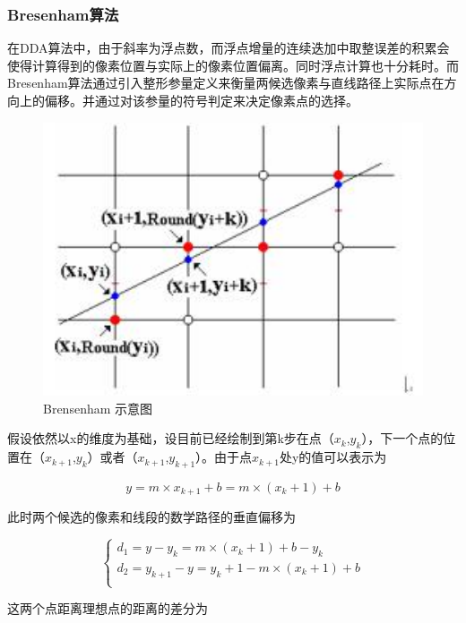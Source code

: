 \documentclass[a4paper,UTF8]{article}
\theoremstyle{definition}
\begin{document}
\subsubsection{Bresenham算法}
在DDA算法中，由于斜率为浮点数，而浮点增量的连续迭加中取整误差的积累会使得计算得到的像素位置与实际上的像素位置偏离。同时浮点计算也十分耗时。而Bresenham算法通过引入整形参量定义来衡量两候选像素与直线路径上实际点在方向上的偏移。并通过对该参量的符号判定来决定像素点的选择。
\begin{figure}[ht]
\centering
\includegraphics[width=13cm]{x1.jpg}
\caption{Brensenham 示意图}
\label{x1}
\end{figure}
\par 假设依然以x的维度为基础，设目前已经绘制到第k步在点（$x_{k}$,$y_{k}$），下一个点的位置在（$x_{k+1}$,$y_{k}$）或者（$x_{k+1}$,$y_{k+1}$）。由于点$x_{k+1}$处y的值可以表示为

\begin{equation}
y = m \times x_{k+1} + b =m \times (x_{k}+1)+b
\end{equation}

\par 此时两个候选的像素和线段的数学路径的垂直偏移为

\begin{equation}
\left\{
\begin{aligned}
d_{1}=y-y_{k}=m \times (x_{k}+1)+b-y_{k}\\
d_{2}=y_{k+1}-y=y_{k}+1-m \times (x_{k}+1)+b\\
\end{aligned}
\right.
\end{equation}
\par 这两个点距离理想点的距离的差分为
\end{document}
